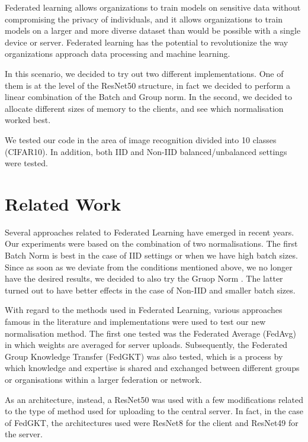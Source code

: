 \documentclass[conference]{IEEEtran}
\begin{document}
Federated learning allows organizations to train models on sensitive data without compromising the privacy of individuals, and it allows organizations to train models on a larger and more diverse dataset than would be possible with a single device or server. Federated learning has the potential to revolutionize the way organizations approach data processing and machine learning\cite{b1}.

In this scenario, we decided to try out two different implementations. One of them is at the level of the ResNet50 structure, in fact we decided to perform a linear combination of the Batch and Group norm. In the second, we decided to allocate different sizes of memory to the clients, and see which normalisation worked best.

We tested our code in the area of image recognition divided into 10 classes (CIFAR10). In addition, both IID and Non-IID balanced/unbalanced settings were tested.

\section{Related Work}

Several approaches related to Federated Learning have emerged in recent years. Our experiments were based on the combination of two normalisations. The first Batch Norm \cite{b2} is best in the case of IID settings or when we have high batch sizes. Since as soon as we deviate from the conditions mentioned above, we no longer have the desired results, we decided to also try the Gruop Norm \cite{b3}. The latter turned out to have better effects in the case of Non-IID and smaller batch sizes.

With regard to the methods used in Federated Learning, various approaches famous in the literature and implementations were used to test our new normalisation method. The first one tested was the Federated Average (FedAvg) \cite{b4} in which weights are averaged for server uploads. Subsequently, the Federated Group Knowledge Transfer (FedGKT)\cite{b5}  was also tested, which is a process by which knowledge and expertise is shared and exchanged between different groups or organisations within a larger federation or network.

As an architecture, instead, a ResNet50 \cite{b6} was used with a few modifications related to the type of method used for uploading to the central server. In fact, in the case of FedGKT, the architectures used were ResNet8 for the client and ResNet49 for the server. 
\end{document}
